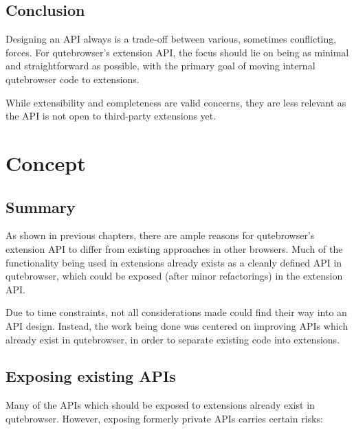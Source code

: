 \documentclass[a4paper,parskip=full]{scrreprt}
\begin{document}
\section{Conclusion}
Designing an API always is a trade-off between various, sometimes conflicting,
forces. For qutebrowser's extension API, the focus should lie on being as
minimal and straightforward as possible, with the primary goal of moving
internal qutebrowser code to extensions.

While extensibility and completeness are valid concerns, they are less relevant
as the API is not open to third-party extensions yet.

\chapter{Concept}
\label{ch:concept}

\section{Summary}
As shown in previous chapters, there are ample reasons for qutebrowser's
extension API to differ from existing approaches in other browsers. Much of the
functionality being used in extensions already exists as a cleanly defined API
in qutebrowser, which could be exposed (after minor refactorings) in the
extension API.

Due to time constraints, not all considerations made could find their way into
an API design. Instead, the work being done was centered on improving APIs which
already exist in qutebrowser, in order to separate existing code into extensions.

\section{Exposing existing APIs}
Many of the APIs which should be exposed to extensions already exist in
qutebrowser. However, exposing formerly private APIs carries certain risks:
\end{document}
